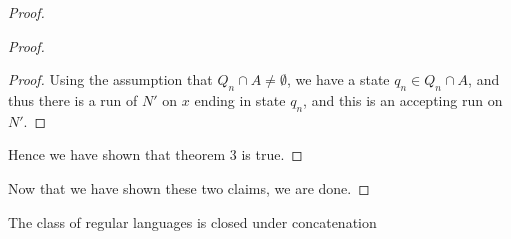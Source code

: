 \documentclass[a4paper]{article}
\begin{document}
\begin{proof}
\begin{proof}
\begin{proof}
            Using the assumption that $Q_n \cap A \ne \emptyset$, we have a state $q_n \in Q_n \cap A$, and thus there is a run of $N'$ on $x$ ending in state $q_n$, and this is an accepting run on
            $N'$.
        \end{proof}


        Hence we have shown that theorem 3 is true.
    \end{proof}


    Now that we have shown these two claims, we are done.

\end{proof}

\begin{theorem}
    The class of regular languages is closed under concatenation
\end{theorem}
\end{document}
